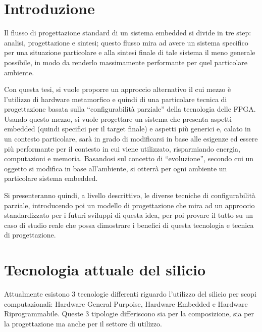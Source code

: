 \documentclass[a4paper,titlepage]{book}
\begin{document}
\begin{frontespizio}
\end{frontespizio}


\chapter*{Introduzione}

Il flusso di progettazione standard di un sistema embedded si divide in tre step: analisi, progettazione e sintesi; questo flusso mira ad avere un sistema specifico per una situazione particolare e alla sintesi finale di tale sistema il meno generale possibile, in modo da renderlo massimamente performante per quel particolare ambiente.

Con questa tesi, si vuole proporre un approccio alternativo il cui mezzo è l'utilizzo di hardware metamorfico e quindi di una particolare tecnica di progettazione basata sulla ``configurabilità parziale'' della tecnologia delle FPGA. Usando questo mezzo, si vuole progettare un sistema che presenta aspetti embedded (quindi specifici per il target finale) e aspetti più generici e, calato in un contesto particolare, sarà in grado di modificarsi in base alle esigenze ed essere più performante per il contesto in cui viene utilizzato, risparmiando energia, computazioni e memoria. Basandosi sul concetto di ``evoluzione'', secondo cui un oggetto si modifica in base all'ambiente, si otterrà per ogni ambiente un particolare sistema embedded.

Si presenteranno quindi, a livello descrittivo, le diverse tecniche di configurabilità parziale, introducendo poi un modello di progettazione che mira ad un approccio standardizzato per i futuri sviluppi di questa idea, per poi provare il tutto su un caso di studio reale che possa dimostrare i benefici di questa tecnologia e tecnica di progettazione.


\tableofcontents

\chapter{Tecnologia attuale del silicio}
Attualmente esistono 3 tecnologie differenti riguardo l'utilizzo del silicio per scopi computazionali: Hardware General Purpoise, Hardware Embedded e Hardware Riprogrammabile. Queste 3 tipologie differiscono sia per la composizione, sia per la progettazione ma anche per il settore di utilizzo.
\end{document}
